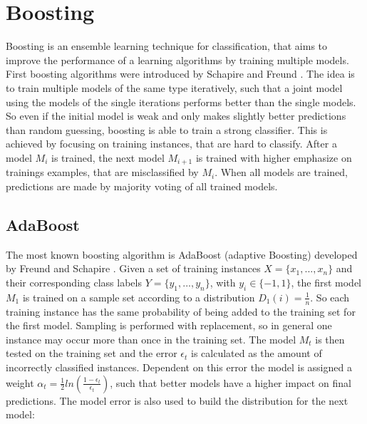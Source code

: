 \documentclass[10pt]{reportMaster}
\begin{document}




\section{Boosting}
\label{sec:boosting}
Boosting is an ensemble learning technique for classification, that aims to improve the performance of a learning algorithms by training multiple models.
First boosting algorithms were introduced by Schapire \cite{boostingSchapire} and Freund \cite{boostingFreund}.
The idea is to train multiple models of the same type iteratively, such that a joint model using the models of the single iterations performs better than the single models.
So even if the initial model is weak and only makes slightly better predictions than random guessing, boosting is able to train a strong classifier.
This is achieved by focusing on training instances, that are hard to classify.
After a model $M_i$ is trained, the next model $M_{i+1}$ is trained with higher emphasize on trainings examples, that are misclassified by $M_i$. 
When all models are trained, predictions are made by majority voting of all trained models.

\subsection{AdaBoost}
\label{sec:adaBoost}
The most known boosting algorithm is AdaBoost (adaptive Boosting) developed by Freund and Schapire \cite{boostingIntro}.
Given a set of training instances $X = \{x_1, ..., x_n\}$ and their corresponding class labels $Y = \{y_1, ..., y_n\}$, with $y_i \in \{-1, 1\}$, the first model $M_1$ is trained on a sample set according to a distribution $D_1(i) = \frac{1}{n}$. So each training instance has the same probability of being added to the training set for the first model.
Sampling is performed with replacement, so in general one instance may occur more than once in the training set.
The model $M_t$ is then tested on the training set and the error $\epsilon_t$ is calculated as the amount of incorrectly classified instances.
Dependent on this error the model is assigned a weight $\alpha_t = \frac{1}{2} ln(\frac{1 - \epsilon_t}{\epsilon_t})$, such that better models have a higher impact on final predictions.
The model error is also used to build the distribution for the next model: 
\end{document}
